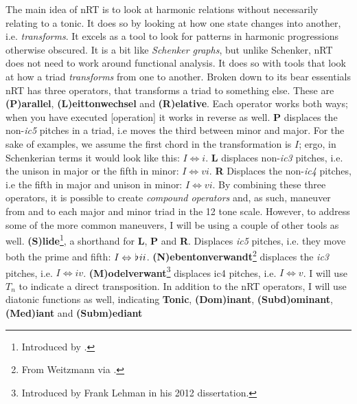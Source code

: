 The main idea of \ac{nRT} is to look at harmonic relations without necessarily relating to a tonic. It does so by looking at how one state changes into another, i.e. \textit{transforms}. It excels as a tool to look for patterns in harmonic progressions otherwise obscured. It is a bit like \textit{Schenker graphs}, but unlike Schenker, \ac{nRT} does not need to work around functional analysis. It does so with tools that look at how a triad \textit{transforms} from one to another. Broken down to its bear essentials \ac{nRT} has three operators, that transforms a triad to something else. These are \textbf{(P)arallel}, \textbf{(L)eittonwechsel} and \textbf{(R)elative}. Each operator works both ways; when you have executed [operation] it works in reverse as well. 
\textbf{P} displaces the non-\textit{ic5} pitches in a triad, i.e moves the third between minor and major. For the sake of examples, we assume the first chord in the transformation is \(I\); ergo, in Schenkerian terms it would look like this: \({I}\Leftrightarrow{i}\). 
\textbf{L} displaces non-\textit{ic3} pitches, i.e. the unison in major or the fifth in minor: \({I}\Leftrightarrow{vi}\).
\textbf{R} Displaces the non-\textit{ic4} pitches, i.e the fifth in major and unison in minor: \({I}\Leftrightarrow{vi}\). 
By combining these three operators, it is possible to create \textit{compound operators} and, as such, maneuver from and to each major and minor triad in the 12 tone scale. However, to address some of the more common maneuvers, I will be using a couple of other tools as well. 
\textbf{(S)lide}\footnote{Introduced by \citealt{lewin_generalized_2007}.}, a shorthand for \textbf{L}, \textbf{P} and \textbf{R}. Displaces \textit{ic5} pitches, i.e. they move both the prime and fifth: \({I}\Leftrightarrow{\hspace*{0.18ex}\flat\hspace*{0.18ex}}{ii}\). 
\textbf{(N)ebentonverwandt}\footnote{From Weitzmann via \citealt{lehman_reading_2012}.} displaces the \textit{ic3} pitches, i.e. \({I}\Leftrightarrow{iv}\).  
\textbf{(M)odelverwant}\footnote{Introduced by Frank Lehman in his 2012 dissertation.} displaces ic4 pitches, i.e. \({I}\Leftrightarrow{v}\). I will use \(T_{n}\) to indicate a direct transposition. In addition to the \ac{nRT} operators, I will use diatonic functions as well, indicating \textbf{Tonic}, \textbf{(Dom)inant}, \textbf{(Subd)ominant}, \textbf{(Med)iant} and \textbf{(Subm)ediant} 


